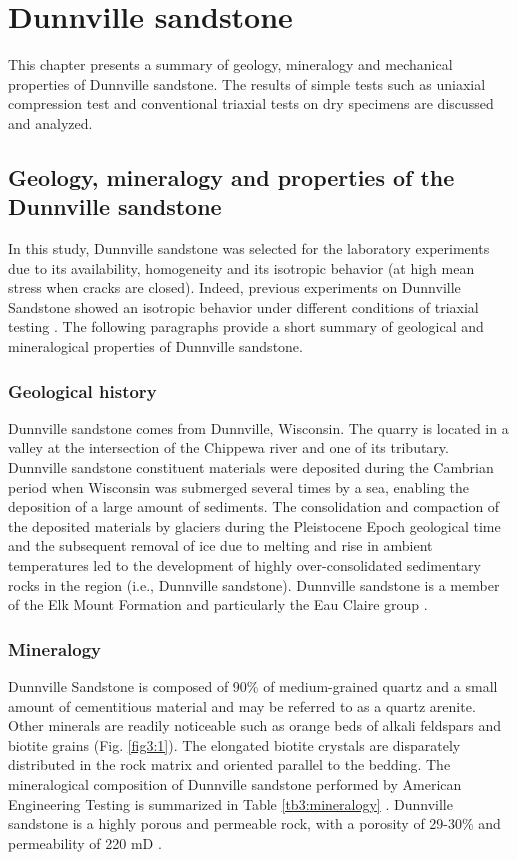 \chapter{Dunnville sandstone}\label{ch3:title}


This chapter presents a summary of geology, mineralogy and mechanical properties of Dunnville sandstone. The results of simple tests such as uniaxial compression test and conventional triaxial tests on dry specimens are discussed and analyzed.

\section{Geology, mineralogy and properties of the Dunnville sandstone}

In this study, Dunnville sandstone was selected for the laboratory experiments due to its availability, homogeneity and its isotropic behavior (at high mean stress when cracks are closed). Indeed, previous experiments on Dunnville Sandstone showed an isotropic behavior under different conditions of triaxial testing \cite{Tarokh2016}. The following paragraphs provide a short summary of geological and mineralogical properties of Dunnville sandstone.

\subsection{Geological history}

Dunnville sandstone comes from Dunnville, Wisconsin. The quarry is located in a valley at the intersection of the Chippewa river and one of its tributary. Dunnville sandstone constituent materials were deposited during the Cambrian period when Wisconsin was submerged several times by a sea, enabling the deposition of a large amount of sediments. The consolidation and compaction of the deposited materials by glaciers during the Pleistocene Epoch geological time and the subsequent removal of ice due to melting and rise in ambient temperatures led to the development of highly over-consolidated sedimentary rocks in the region (i.e., Dunnville sandstone). Dunnville sandstone is a member of the Elk Mount Formation and particularly the Eau Claire group \cite{Ostrom1966}.

\subsection{Mineralogy}

Dunnville Sandstone is composed of 90\% of medium-grained quartz and a small amount of cementitious material and may be referred to as a quartz arenite. Other minerals are readily noticeable such as orange beds of alkali feldspars and biotite grains (Fig. \ref{fig3:1}). The elongated biotite crystals are disparately distributed in the rock matrix and oriented parallel to the bedding. The mineralogical composition of Dunnville sandstone performed by American Engineering Testing is summarized in Table \ref{tb3:mineralogy} \cite{Tarokh2016}. Dunnville sandstone is a highly porous and permeable rock, with a porosity of 29-30\% and permeability of 220 mD \cite{Tarokh2016}.

